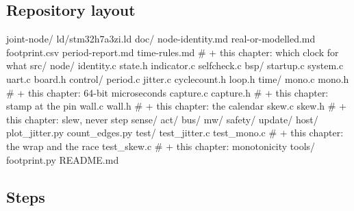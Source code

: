 \subsection*{Repository layout}

\begin{plaincode}
joint-node/
  ld/stm32h7a3zi.ld
  doc/
    node-identity.md  real-or-modelled.md  footprint.csv  period-report.md
    time-rules.md                       # + this chapter: which clock for what
  src/
    node/    identity.c state.h indicator.c selfcheck.c
    bsp/     startup.c system.c uart.c board.h
    control/ period.c jitter.c cyclecount.h loop.h
    time/
      mono.c  mono.h                    # + this chapter: 64-bit microseconds
      capture.c capture.h               # + this chapter: stamp at the pin
      wall.c  wall.h                    # + this chapter: the calendar
      skew.c  skew.h                    # + this chapter: slew, never step
    sense/  act/  bus/  mw/  safety/  update/
  host/  plot_jitter.py  count_edges.py
  test/
    test_jitter.c
    test_mono.c                         # + this chapter: the wrap and the race
    test_skew.c                         # + this chapter: monotonicity
  tools/ footprint.py
  README.md
\end{plaincode}

\subsection*{Steps}

